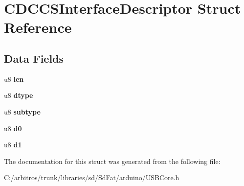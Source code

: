 \hypertarget{struct_c_d_c_c_s_interface_descriptor}{\section{C\-D\-C\-C\-S\-Interface\-Descriptor Struct Reference}
\label{struct_c_d_c_c_s_interface_descriptor}
}
\subsection*{Data Fields}
\begin{DoxyCompactItemize}
\item 
\hypertarget{struct_c_d_c_c_s_interface_descriptor_afbf3f3230446569534d5f466aaf4c23b}{u8 {\bfseries len}}\label{struct_c_d_c_c_s_interface_descriptor_afbf3f3230446569534d5f466aaf4c23b}

\item 
\hypertarget{struct_c_d_c_c_s_interface_descriptor_a0bb419531ec75697e63e9109fecf81b0}{u8 {\bfseries dtype}}\label{struct_c_d_c_c_s_interface_descriptor_a0bb419531ec75697e63e9109fecf81b0}

\item 
\hypertarget{struct_c_d_c_c_s_interface_descriptor_afb82dd1313bc5284e4e5aef8218ef414}{u8 {\bfseries subtype}}\label{struct_c_d_c_c_s_interface_descriptor_afb82dd1313bc5284e4e5aef8218ef414}

\item 
\hypertarget{struct_c_d_c_c_s_interface_descriptor_a3e359aaf0f33f4eeedb3f26e73ac1cc7}{u8 {\bfseries d0}}\label{struct_c_d_c_c_s_interface_descriptor_a3e359aaf0f33f4eeedb3f26e73ac1cc7}

\item 
\hypertarget{struct_c_d_c_c_s_interface_descriptor_ac1f3ea17c85c96dbc7ec1dba968be24f}{u8 {\bfseries d1}}\label{struct_c_d_c_c_s_interface_descriptor_ac1f3ea17c85c96dbc7ec1dba968be24f}

\end{DoxyCompactItemize}


The documentation for this struct was generated from the following file\-:\begin{DoxyCompactItemize}
\item 
C\-:/arbitros/trunk/libraries/sd/\-Sd\-Fat/arduino/U\-S\-B\-Core.\-h\end{DoxyCompactItemize}
